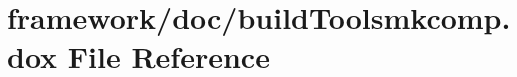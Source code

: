 \hypertarget{build_toolsmkcomp_8dox}{}\section{framework/doc/build\+Toolsmkcomp.dox File Reference}
\label{build_toolsmkcomp_8dox}
